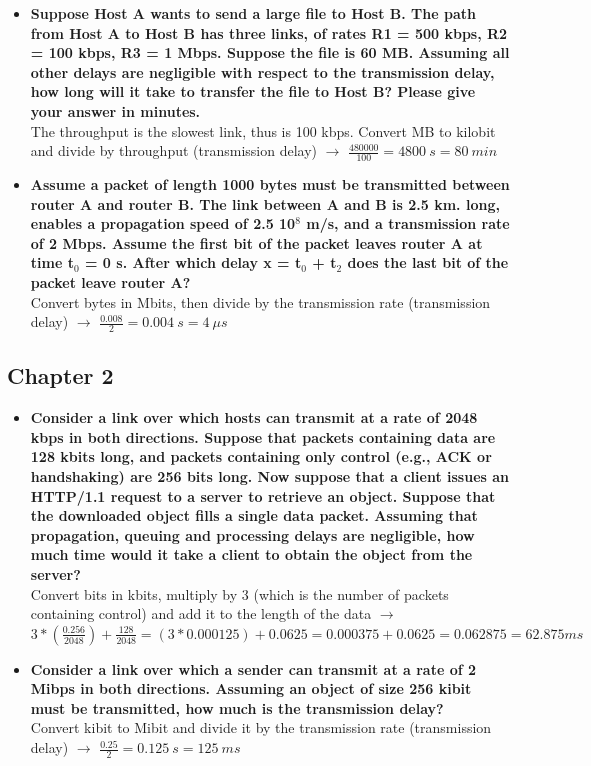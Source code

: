 \documentclass{article}
\begin{document}
\begin{itemize}
	\item \textbf{Suppose Host A wants to send a large file to Host B. The path from Host A to Host B has three links, of rates R1 = 500 kbps, R2 = 100 kbps, R3 = 1 Mbps. Suppose the file is 60 MB. Assuming all other delays are negligible with respect to the transmission delay, how long will it take to transfer the file to Host B? Please give your answer in minutes.}
	\vspace{.2cm} \\
	The throughput is the slowest link, thus is 100 kbps. Convert MB to kilobit and divide by throughput (transmission delay) $\rightarrow$ $\frac{480000}{100} = 4800~s = 80~min$
	
	\item \textbf{Assume a packet of length 1000 bytes must be transmitted between router A and router B. The link between A and B is 2.5 km. long, enables a propagation speed of 2.5 10$^8$ m/s, and a transmission rate of 2 Mbps. Assume the first bit of the packet leaves router A at time t$_0$ = 0 s. After which delay x = t$_0$ + t$_2$ does the last bit of the packet leave router A?}
	\vspace{.2cm} \\
	Convert bytes in Mbits, then divide by the transmission rate (transmission delay) $\rightarrow$ $\frac{0.008}{2} = 0.004~s = 4~\mu s$
\end{itemize}

\subsection{Chapter 2}
\begin{itemize}
	\item \textbf{Consider a link over which hosts can transmit at a rate of 2048 kbps in both directions. Suppose that packets containing data are 128 kbits long, and packets containing only control (e.g., ACK or handshaking) are 256 bits long. Now suppose that a client issues an HTTP/1.1 request to a server to retrieve an object. Suppose that the downloaded object fills a single data packet. Assuming that propagation, queuing and processing delays are negligible, how much time would it take a client to obtain the object from the server?}
	\vspace{.2cm} \\
	Convert bits in kbits, multiply by 3 (which is the number of packets containing control) and add it to the length of the data $\rightarrow$ $3*\left(\frac{0.256}{2048}\right)+\frac{128}{2048} = (3 * 0.000125) + 0.0625 = 0.000375 + 0.0625 = 0.062875 = 62.875 ms$
	
	\item \textbf{Consider a link over which a sender can transmit at a rate of 2 Mibps in both directions. Assuming an object of size 256 kibit must be transmitted, how much is the transmission delay?}
	\vspace{.2cm} \\
	Convert kibit to Mibit and divide it by the transmission rate (transmission delay) $\rightarrow$ $\frac{0.25}{2} = 0.125~s = 125~ms$
\end{itemize}
\end{document}
